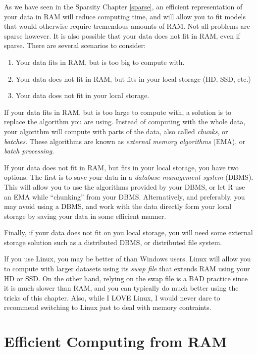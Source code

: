 \documentclass[]{book}
\providecommand{\tightlist}{%
  \setlength{\itemsep}{0pt}\setlength{\parskip}{0pt}}
\theoremstyle{definition}
\theoremstyle{definition}
\theoremstyle{definition}
\theoremstyle{remark}
\let\BeginKnitrBlock\begin \let\EndKnitrBlock\end
\begin{document}
As we have seen in the Sparsity Chapter \ref{sparse}, an efficient
representation of your data in RAM will reduce computing time, and will
allow you to fit models that would otherwise require tremendous amounts
of RAM. Not all problems are sparse however. It is also possible that
your data does not fit in RAM, even if sparse. There are several
scenarios to consider:

\begin{enumerate}
\def\labelenumi{\arabic{enumi}.}
\tightlist
\item
  Your data fits in RAM, but is too big to compute with.
\item
  Your data does not fit in RAM, but fits in your local storage (HD,
  SSD, etc.)
\item
  Your data does not fit in your local storage.
\end{enumerate}

If your data fits in RAM, but is too large to compute with, a solution
is to replace the algorithm you are using. Instead of computing with the
whole data, your algorithm will compute with parts of the data, also
called \emph{chunks}, or \emph{batches}. These algorithms are known as
\emph{external memory algorithms} (EMA), or \emph{batch processing}.

If your data does not fit in RAM, but fits in your local storage, you
have two options. The first is to save your data in a \emph{database
management system} (DBMS). This will allow you to use the algorithms
provided by your DBMS, or let R use an EMA while ``chunking'' from your
DBMS. Alternatively, and preferably, you may avoid using a DBMS, and
work with the data directly form your local storage by saving your data
in some efficient manner.

Finally, if your data does not fit on you local storage, you will need
some external storage solution such as a distributed DBMS, or
distributed file system.

\BeginKnitrBlock{remark}
{}If you use Linux, you may be better of than
Windows users. Linux will allow you to compute with larger datasets
using its \emph{swap file} that extends RAM using your HD or SSD. On the
other hand, relying on the swap file is a BAD practice since it is much
slower than RAM, and you can typically do much better using the tricks
of this chapter. Also, while I LOVE Linux, I would never dare to
recommend switching to Linux just to deal with memory contraints.
\EndKnitrBlock{remark}

\section{Efficient Computing from
RAM}\label{efficient-computing-from-ram}
\end{document}
